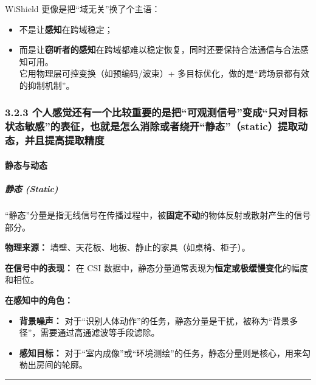 \documentclass[
]{article}
\begin{document}
WiShield 更像是把``域无关''换了个主语：

\begin{itemize}
\item
  不是让\textbf{感知}在跨域稳定；
\item
  而是让\textbf{窃听者的感知}在跨域都难以稳定恢复，同时还要保持合法通信与合法感知可用。\\
  它用物理层可控变换（如预编码/波束）+
  多目标优化，做的是``跨场景都有效的抑制机制''。
\end{itemize}

\subsubsection{3.2.3
个人感觉还有一个比较重要的是把``可观测信号''变成``只对目标状态敏感''的表征，也就是怎么消除或者绕开``静态''（static）提取动态，并且提高提取精度}\label{323-ux4e2aux4ebaux611fux89c9ux8fd8ux6709ux4e00ux4e2aux6bd4ux8f83ux91cdux8981ux7684ux662fux628aux53efux89c2ux6d4bux4fe1ux53f7ux53d8ux6210ux53eaux5bf9ux76eeux6807ux72b6ux6001ux654fux611fux7684ux8868ux5f81ux4e5fux5c31ux662fux600eux4e48ux6d88ux9664ux6216ux8005ux7ed5ux5f00ux9759ux6001staticux63d0ux53d6ux52a8ux6001ux5e76ux4e14ux63d0ux9ad8ux63d0ux53d6ux7cbeux5ea6}

\paragraph{静态与动态}\label{ux9759ux6001ux4e0eux52a8ux6001}

\subparagraph{静态 (Static)}\label{ux9759ux6001-static}

``静态''分量是指无线信号在传播过程中，被\textbf{固定不动}的物体反射或散射产生的信号部分。

\textbf{物理来源：} 墙壁、天花板、地板、静止的家具（如桌椅、柜子）。

\textbf{在信号中的表现：} 在 CSI
数据中，静态分量通常表现为\textbf{恒定或极缓慢变化}的幅度和相位。

\textbf{在感知中的角色：}

\begin{itemize}
\item
  \textbf{背景噪声：}
  对于``识别人体动作''的任务，静态分量是干扰，被称为``背景多径''，需要通过高通滤波等手段滤除。
\item
  \textbf{感知目标：}
  对于``室内成像''或``环境测绘''的任务，静态分量则是核心，用来勾勒出房间的轮廓。
\end{itemize}

\begin{center}\rule{0.5\linewidth}{0.5pt}\end{center}
\end{document}
